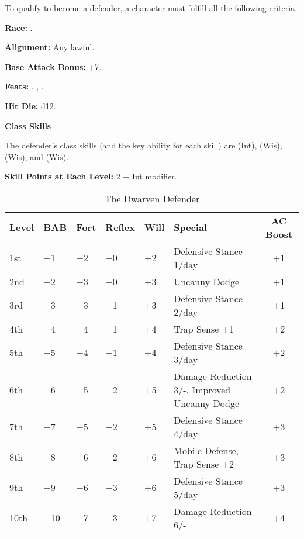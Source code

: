 
\Requirements

To qualify to become a defender, a character must fulfill all the following criteria.

\textbf{Race:} .

\textbf{Alignment:} Any lawful.

\textbf{Base Attack Bonus:} +7.

\textbf{Feats:} , , .

\Basics

\textbf{Hit Die:} d12.

\textbf{Class Skills}

The defender's class skills (and the key ability for each skill) are  (Int), 
 (Wis),  (Wis), and  (Wis).

\textbf{Skill Points at Each Level:} 2 + Int modifier.

\begin{table}[htb]
\caption{The Dwarven Defender}
\centering
\begin{tabular}{*{6}{l}c}
\textbf{Level} & \textbf{BAB} & \textbf{Fort} & \textbf{Reflex} & \textbf{Will} & \textbf{Special} & \textbf{AC Boost} \\
1st & +1 & +2 & +0 & +2 & Defensive Stance 1/day & +1\\
2nd & +2 & +3 & +0 & +3 & Uncanny Dodge & +1\\
3rd & +3 & +3 & +1 & +3 & Defensive Stance 2/day & +1\\
4th & +4 & +4 & +1 & +4 & Trap Sense +1 & +2\\
5th & +5 & +4 & +1 & +4 & Defensive Stance 3/day & +2\\
6th & +6 & +5 & +2 & +5 & Damage Reduction 3/-, Improved Uncanny Dodge & +2\\
7th & +7 & +5 & +2 & +5 & Defensive Stance 4/day & +3\\
8th & +8 & +6 & +2 & +6 & Mobile Defense, Trap Sense +2 & +3\\
9th & +9 & +6 & +3 & +6 & Defensive Stance 5/day & +3\\
10th & +10 & +7 & +3 & +7 & Damage Reduction 6/- & +4\\
\end{tabular}
\end{table}

